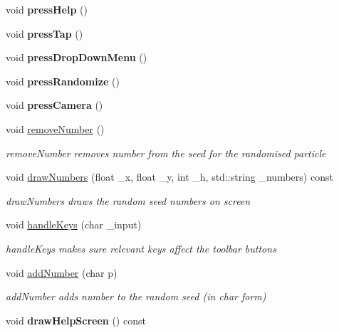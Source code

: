 \begin{DoxyCompactItemize}
\item 
\hypertarget{classToolbar_ae0e45861a4a792c352ca409cd31e09fc}{void {\bfseries press\-Help} ()}\label{classToolbar_ae0e45861a4a792c352ca409cd31e09fc}

\item 
\hypertarget{classToolbar_a14b00fa84391b1a775b692ac33a886da}{void {\bfseries press\-Tap} ()}\label{classToolbar_a14b00fa84391b1a775b692ac33a886da}

\item 
\hypertarget{classToolbar_a38bf8d832bdc85b8474ca6dcf6cdbcd4}{void {\bfseries press\-Drop\-Down\-Menu} ()}\label{classToolbar_a38bf8d832bdc85b8474ca6dcf6cdbcd4}

\item 
\hypertarget{classToolbar_af61099a07fe60802002f80b74fadb32d}{void {\bfseries press\-Randomize} ()}\label{classToolbar_af61099a07fe60802002f80b74fadb32d}

\item 
\hypertarget{classToolbar_a67f52139298893d14adad059fed72cb6}{void {\bfseries press\-Camera} ()}\label{classToolbar_a67f52139298893d14adad059fed72cb6}

\item 
\hypertarget{classToolbar_a30ec2b7200f4ca7b9b9a603288a4ed21}{void \hyperlink{classToolbar_a30ec2b7200f4ca7b9b9a603288a4ed21}{remove\-Number} ()}\label{classToolbar_a30ec2b7200f4ca7b9b9a603288a4ed21}

\begin{DoxyCompactList}\small\item\em remove\-Number removes number from the seed for the randomised particle \end{DoxyCompactList}\item 
void \hyperlink{classToolbar_a8d529f805892e11052635ab1b95d453d}{draw\-Numbers} (float \-\_\-x, float \-\_\-y, int \-\_\-h, std\-::string \-\_\-numbers) const 
\begin{DoxyCompactList}\small\item\em draw\-Numbers draws the random seed numbers on screen \end{DoxyCompactList}\item 
void \hyperlink{classToolbar_a5563bdb5e874e1f2a0101dfd6e927941}{handle\-Keys} (char \-\_\-input)
\begin{DoxyCompactList}\small\item\em handle\-Keys makes sure relevant keys affect the toolbar buttons \end{DoxyCompactList}\item 
void \hyperlink{classToolbar_ab0051a6c70fad118c997b7d72e85d34f}{add\-Number} (char p)
\begin{DoxyCompactList}\small\item\em add\-Number adds number to the random seed (in char form) \end{DoxyCompactList}\item 
\hypertarget{classToolbar_aeb833afffead641813da1eec98f0bcad}{void {\bfseries draw\-Help\-Screen} () const }\label{classToolbar_aeb833afffead641813da1eec98f0bcad}

\end{DoxyCompactItemize}


